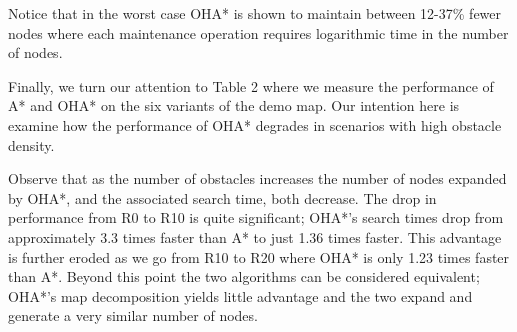 Notice that in the worst case OHA* is shown to maintain between 12-37\% fewer nodes where each
maintenance operation requires logarithmic time in the number of nodes.
\par
Finally, we turn our attention to Table 2 where we measure the 
performance of A* and OHA* on the six variants of the demo map.
Our intention here is examine how the performance of OHA* degrades in scenarios with
high obstacle density.

Observe that as the number of obstacles increases the number of nodes expanded by OHA*, and the
associated search time, both decrease. 
The drop in performance from R0 to R10 is quite significant; OHA*'s search times drop
from approximately 3.3 times faster than A* to just 1.36 times faster.
This advantage is further eroded as we go from R10 to R20 where OHA* is only 
1.23 times faster than A*.
Beyond this point the two algorithms can be considered equivalent;
OHA*'s map decomposition yields little advantage and the two expand and generate 
a very similar number of nodes.
